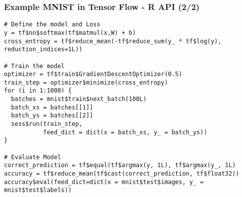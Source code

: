 \documentclass[9pt]{beamer}
\begin{document}
\begin{frame}[fragile]
\frametitle{Example MNIST in Tensor Flow - R API (2/2)}
\begin{lstlisting}[frame=single] 
# Define the model and Loss
y = tf$nn$softmax(tf$matmul(x,W) + b)
cross_entropy = tf$reduce_mean(-tf$reduce_sum(y_ * tf$log(y), reduction_indices=1L))

# Train the model
optimizer = tf$train$GradientDescentOptimizer(0.5)
train_step = optimizer$minimize(cross_entropy)
for (i in 1:1000) {
  batches = mnist$train$next_batch(100L) 
  batch_xs = batches[[1]]
  batch_ys = batches[[2]]
  sess$run(train_step,
           feed_dict = dict(x = batch_xs, y_ = batch_ys))
}

# Evaluate Model
correct_prediction = tf$equal(tf$argmax(y, 1L), tf$argmax(y_, 1L)
accuracy = tf$reduce_mean(tf$cast(correct_prediction, tf$float32))
accuracy$eval(feed_dict=dict(x = mnist$test$images, y_ = mnist$test$labels))
\end{lstlisting}
\end{frame}
\end{document}
